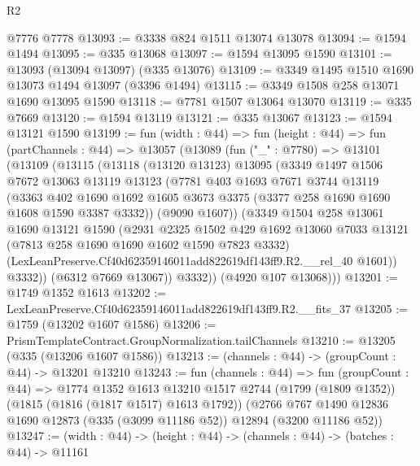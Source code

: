 \begin{lexlean}{R2}
\begin{coremodule}
    @7776
    @7778
@13093 := @3338 @824 @1511 @13074 @13078
@13094 := @1594 @1494
@13095 := @335 @13068
@13097 := @1594 @13095 @1590
@13101 := @13093 (@13094 @13097) (@335 @13076)
@13109 := @3349 @1495 @1510 @1690 @13073 @1494 @13097 (@3396 @1494)
@13115 := @3349 @1508 @258 @13071 @1690 @13095 @1590
@13118 := @7781 @1507 @13064 @13070
@13119 := @335 @7669
@13120 := @1594 @13119
@13121 := @335 @13067
@13123 := @1594 @13121 @1590
@13199 := fun (width : @44) =>
  fun (height : @44) =>
  fun (partChannels : @44) =>
  @13057
    (@13089
      (fun ("_" : @7780) =>
      @13101
        (@13109
          (@13115
            (@13118
              (@13120 @13123)
              @13095
              (@3349
                @1497
                @1506
                @7672
                @13063
                @13119
                @13123
                (@7781
                  @403
                  @1693
                  @7671
                  @3744
                  @13119
                  (@3363
                    @402
                    @1690
                    @1692
                    @1605
                    @3673
                    @3375
                    (@3377 @258 @1690 @1690 @1608 @1590 @3387 @3332))
                  (@9090 @1607))
                (@3349
                  @1504
                  @258
                  @13061
                  @1690
                  @13121
                  @1590
                  (@2931
                    @2325
                    @1502
                    @429
                    @1692
                    @13060
                    @7033
                    @13121
                    (@7813 @258 @1690 @1690 @1602 @1590 @7823 @3332)
                    (LexLeanPreserve.Cf40d62359146011add822619df143ff9.R2.__rel_40 @1601))
                  @3332))
              (@6312 @7669 @13067))
            @3332))
        (@4920 @107 @13068)))
@13201 := @1749 @1352 @1613
@13202 := LexLeanPreserve.Cf40d62359146011add822619df143ff9.R2.__fits_37
@13205 := @1759 (@13202 @1607 @1586)
@13206 := PrismTemplateContract.GroupNormalization.tailChannels
@13210 := @13205 (@335 (@13206 @1607 @1586))
@13213 := (channels : @44) -> (groupCount : @44) -> @13201 @13210
@13243 := fun (channels : @44) =>
  fun (groupCount : @44) =>
  @1774
    @1352
    @1613
    @13210
    @1517
    @2744
    (@1799 (@1809 @1352))
    (@1815 (@1816 (@1817 @1517) @1613 @1792))
    (@2766 @767 @1490 @12836 @1690 @12873 (@335 (@3099 @11186 @52)) @12894 (@3200 @11186 @52))
@13247 := (width : @44) -> (height : @44) -> (channels : @44) -> (batches : @44) -> @11161

\end{coremodule}
\end{lexlean}
